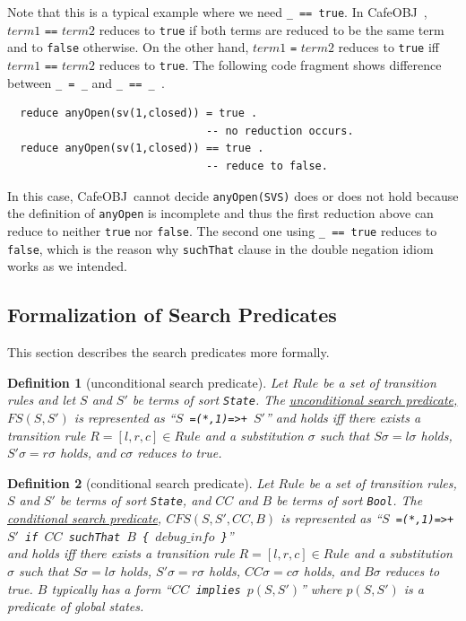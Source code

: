 \documentclass[12pt]{report}
\newtheorem{definition}{Definition}
\newcommand{\stt}[1]{{\small{\tt {#1}}}}
\newcommand{\ul}{\underline}
\newcommand{\cafeobj}{{\sf CafeOBJ}~}
\begin{document}
Note that this is a typical example where we need \stt{\_ == true}. In
\cafeobj, $term1$ {\tt ==} $term2$ reduces to {\tt true} if both terms
are reduced to be the same term and to {\tt false} otherwise. On the
other hand, $term1$ {\tt =} $term2$ reduces to {\tt true} iff $term1$
{\tt ==} $term2$ reduces to {\tt true}. The following code fragment
shows difference between \stt{\_ = \_} and \stt{\_ == \_ }.
\small
\begin{verbatim}
  reduce anyOpen(sv(1,closed)) = true .
                               -- no reduction occurs.
  reduce anyOpen(sv(1,closed)) == true . 
                               -- reduce to false.
\end{verbatim}
\normalsize
In this case, \cafeobj cannot decide \stt{anyOpen(SVS)} does or does
not hold because the definition of {\tt anyOpen} is incomplete and
thus the first reduction above can reduce to neither {\tt true} nor
{\tt false}.  The second one using \stt{\_ == true} reduces to
{\tt false}, which is the reason why {\tt suchThat} clause in the
double negation idiom works as we intended.

\subsection{Formalization of Search Predicates}
\label{sec:formalSearch}
This section describes the search predicates more formally.  
\begin{definition}[unconditional search predicate]
  Let $Rule$ be a set of transition rules and let $S$ and $S'$ be
  terms of sort {\tt State}. The \ul{unconditional search predicate,
    $FS(S,S')$} is represented as ``\stt{$S$ =(*,1)=>+ $S'$}''
  and holds iff there exists a transition rule $R=[l,r,c]\in Rule$ and
  a substitution $\sigma$ such that $S\sigma=l\sigma$ holds,
  $S'\sigma=r\sigma$ holds, and $c\sigma$ reduces to true.
\end{definition}
\begin{definition}[conditional search predicate]
  Let $Rule$ be a set of transition rules, $S$ and $S'$ be terms of
  sort {\tt State}, and $CC$ and $B$ be terms of sort {\tt Bool}. The
  \ul{conditional search predicate}, \ul{$CFS(S,S',CC,B)$} is
  represented as ``\stt{$S$ =(*,1)=>+ $S'$ if $CC$ suchThat $B$ \{
    $debug\_info$ \}}''\\ and holds iff there exists a transition
  rule $R=[l,r,c]\in Rule$ and a substitution $\sigma$ such that
  $S\sigma=l\sigma$ holds, $S'\sigma=r\sigma$ holds,
  $CC\sigma=c\sigma$ holds, and $B\sigma$ reduces to true.
  $B$ typically has a form ``\stt{$CC$ implies $p(S,S')$}'' where
  $p(S,S')$ is a predicate of global states.
\end{definition}
\end{document}
